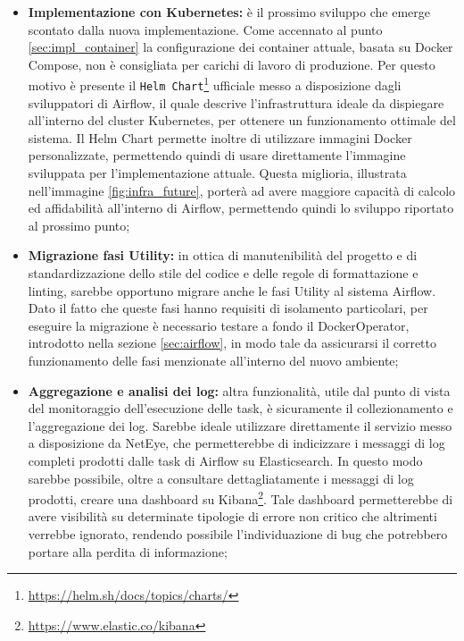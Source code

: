\begin{itemize}
  \item \textbf{Implementazione con Kubernetes:} è il prossimo sviluppo che
    emerge scontato dalla nuova implementazione. Come accennato al punto \ref{sec:impl_container}
    la configurazione dei container attuale, basata su Docker Compose, non è consigliata
    per carichi di lavoro di produzione. Per questo motivo è presente il \texttt{Helm
    Chart}\footnote{\url{https://helm.sh/docs/topics/charts/}} ufficiale messo a
    disposizione dagli sviluppatori di Airflow, il quale descrive l'infrastruttura
    ideale da dispiegare all'interno del cluster Kubernetes, per ottenere un
    funzionamento ottimale del sistema. Il Helm Chart permette inoltre di utilizzare
    immagini Docker personalizzate, permettendo quindi di usare direttamente l'immagine
    sviluppata per l'implementazione attuale. Questa miglioria, illustrata nell'immagine
    \ref{fig:infra_future}, porterà ad avere maggiore capacità di calcolo ed affidabilità
    all'interno di Airflow, permettendo quindi lo sviluppo riportato al prossimo
    punto;

  \item \textbf{Migrazione fasi Utility:} in ottica di manutenibilità del
    progetto e di standardizzazione dello stile del codice e delle regole di
    formattazione e linting, sarebbe opportuno migrare anche le fasi Utility al sistema
    Airflow. Dato il fatto che queste fasi hanno requisiti di isolamento
    particolari, per eseguire la migrazione è necessario testare a fondo il DockerOperator,
    introdotto nella sezione \ref{sec:airflow}, in modo tale da assicurarsi il corretto
    funzionamento delle fasi menzionate all'interno del nuovo ambiente;

  \item \textbf{Aggregazione e analisi dei log:} altra funzionalità, utile dal punto
    di vista del monitoraggio dell'esecuzione delle task, è sicuramente il
    collezionamento e l'aggregazione dei log. Sarebbe ideale utilizzare direttamente
    il servizio messo a disposizione da NetEye, che permetterebbe di indicizzare
    i messaggi di log completi prodotti dalle task di Airflow su Elasticsearch. In
    questo modo sarebbe possibile, oltre a consultare dettagliatamente i
    messaggi di log prodotti, creare una dashboard su Kibana\footnote{\url{https://www.elastic.co/kibana}}.
    Tale dashboard permetterebbe di avere visibilità su determinate tipologie di
    errore non critico che altrimenti verrebbe ignorato, rendendo possibile l'individuazione
    di bug che potrebbero portare alla perdita di informazione;


\end{itemize}
